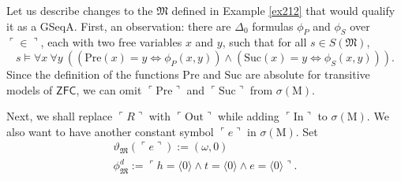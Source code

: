 \documentclass[12pt]{article}
\numberwithin{equation}{section}
\begin{document}
\begin{ex}\label{ex228}
Let us describe changes to the $\mathfrak{M}$ defined in Example \ref{ex212} that would qualify it as a GSeqA. First, an observation: there are $\Delta_0$ formulas $\phi_P$ and $\phi_S$ over $\ulcorner \in \urcorner$, each with two free variables $x$ and $y$, such that for all $s \in S(\mathfrak{M})$,
\begin{equation*}
    s \models \forall x \ \forall y \ ((\mathrm{Pre}(x) = y \iff \phi_P(x, y)) \wedge (\mathrm{Suc}(x) = y \iff \phi_S(x, y))) \text{.}
\end{equation*}
Since the definition of the functions $\mathrm{Pre}$ and $\mathrm{Suc}$ are absolute for transitive models of $\mathsf{ZFC}$, we can omit $\ulcorner \mathrm{Pre} \urcorner$ and $\ulcorner \mathrm{Suc} \urcorner$ from $\sigma(\mathrm{M})$.

Next, we shall replace $\ulcorner R \urcorner$ with $\ulcorner \mathrm{Out} \urcorner$ while adding $\ulcorner \mathrm{In} \urcorner$ to $\sigma(\mathrm{M})$. We also want to have another constant symbol $\ulcorner e \urcorner$ in $\sigma(\mathrm{M})$. Set 
\begin{gather*}
    \vartheta_{\mathfrak{M}}(\ulcorner e \urcorner) := (\omega, 0) \\
    \phi^d_{\mathfrak{M}} := \ulcorner h = \langle 0 \rangle \wedge t = \langle 0 \rangle \wedge e = \langle 0 \rangle \urcorner \text{.}
\end{gather*}


\end{ex}
\end{document}

